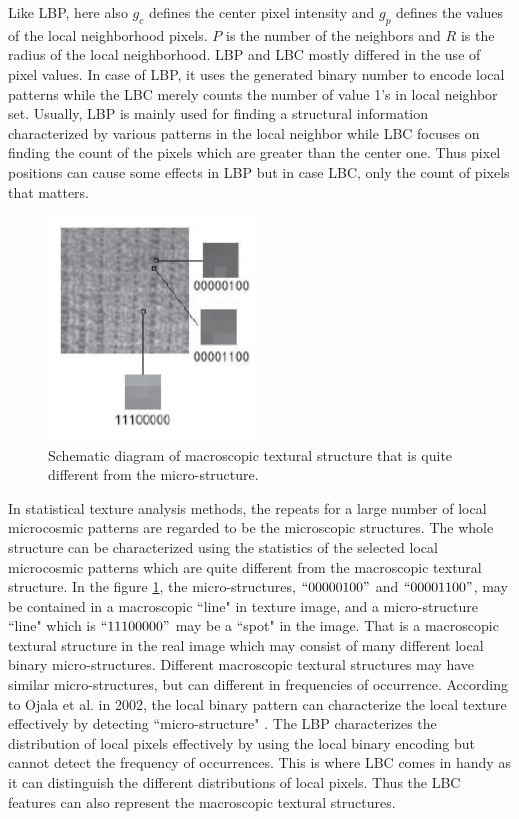 \documentclass[12pt]{article}
\begin{document}
Like LBP, here also $g_c$ defines the center pixel intensity and $g_p$ defines the values of the local neighborhood pixels. $P$ is the number of the neighbors and $R$ is the radius of the local neighborhood. LBP and LBC mostly differed in the use of pixel values. In case of LBP, it uses the generated binary number to encode local patterns while the
LBC merely counts the number of value 1's in local neighbor set. Usually, LBP is mainly used for finding a structural information characterized by various patterns in the local neighbor while LBC focuses on finding the count of the pixels which are greater than the center one. Thus pixel positions can cause some effects in LBP but in case LBC, only the count of pixels that matters.\\


\begin{figure}[h]
	\centering
	\includegraphics[width=0.5\textwidth]{lbc02}
	\caption{Schematic diagram of macroscopic textural structure that is quite
		different from the micro-structure.}
	\label{figure:2.4}
	
\end{figure}
In statistical texture analysis methods, the repeats for a large number of local microcosmic patterns are regarded to be the microscopic structures. The whole structure can be characterized using the statistics of the selected local microcosmic patterns which are quite different from the macroscopic textural structure. In the figure \ref{figure:2.4}, the micro-structures, $``00000100"$ and $``00001100"$, may
be contained in a macroscopic ``line" in texture image, and a
micro-structure ``line" which is $``11100000"$ may be a ``spot" in the
image. That is a macroscopic  textural structure in the real image which
may consist of many different local binary micro-structures. Different macroscopic textural structures may have similar micro-structures, but can different in frequencies of occurrence. According to Ojala et al. in 2002\cite{lbp02}, the
local binary pattern can characterize the local texture effectively
by detecting ``micro-structure" . The LBP
characterizes the distribution of local pixels effectively by using the
local binary encoding but cannot detect the frequency of occurrences. This is where LBC comes in handy as it can distinguish the different distributions of local pixels. Thus the LBC features can also represent
the macroscopic textural structures.
\end{document}
